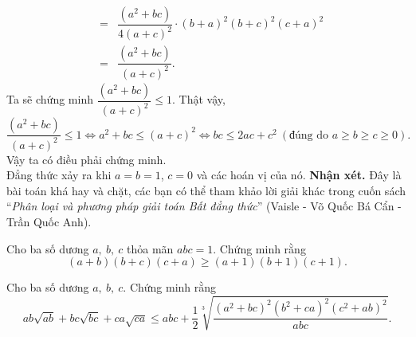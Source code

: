 {\begin{bt}
{\begin{eqnarray*}
			&=&\dfrac{(a^{2}+bc)}{4(a+c)^{2}}\cdot(b+a)^{2}(b+c)^{2}(c+a)^{2}\\
			&=&\dfrac{(a^{2}+bc)}{(a+c)^{2}}.
		\end{eqnarray*}
		Ta sẽ chứng minh $ \dfrac{(a^{2}+bc)}{(a+c)^{2}}\leq 1 $. Thật vậy,
		\[ 
		\dfrac{(a^{2}+bc)}{(a+c)^{2}}\leq 1\Leftrightarrow a^{2}+bc\leq (a+c)^{2}\Leftrightarrow bc\leq 2ac+c^{2}\ (\text{đúng do }a\geq b\geq c\geq 0).
		\]
		Vậy ta có điều phải chứng minh.\\
		Đẳng thức xảy ra khi $ a=b=1 $, $ c=0 $ và các hoán vị của nó.
	}
	\noindent
	\textbf{Nhận xét.} Đây là bài toán khá hay và chặt, các bạn có thể tham khảo lời giải khác trong cuốn sách ``\textit{Phân loại và phương pháp giải toán Bất đẳng thức}'' (Vaisle - Võ Quốc Bá Cẩn - Trần Quốc Anh).
\end{bt}
\begin{bt}%
	Cho ba số dương $ a,\ b,\ c $ thỏa mãn $ abc=1 $. Chứng minh rằng
	\[ 
	(a+b)(b+c)(c+a)\geq (a+1)(b+1)(c+1).
	\]
\end{bt}
\begin{bt}%
	Cho ba số dương $ a,\ b,\ c $. Chứng minh rằng
	\[ 
	ab\sqrt{ab}+bc\sqrt{bc}+ca\sqrt{ca}\leq abc+\dfrac{1}{2}\sqrt[3]{\dfrac{(a^{2}+bc)^{2}(b^{2}+ca)^{2}(c^{2}+ab)^{2}}{abc}}.
	\]
\end{bt}}
